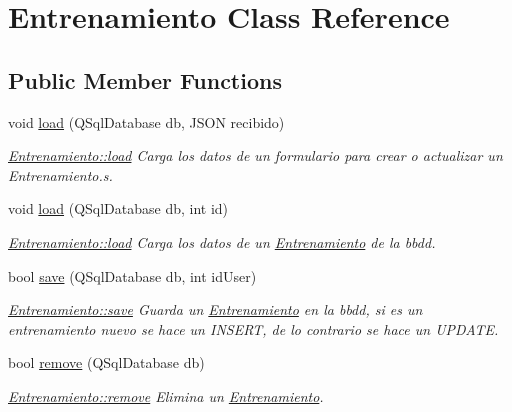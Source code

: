 \hypertarget{classEntrenamiento}{}\section{Entrenamiento Class Reference}
\label{classEntrenamiento}
\subsection*{Public Member Functions}
\begin{DoxyCompactItemize}
\item 
void \mbox{\hyperlink{classEntrenamiento_a5123ff9d743058d3c939b56926200f11}{load}} (Q\+Sql\+Database db, J\+S\+ON recibido)
\begin{DoxyCompactList}\small\item\em \mbox{\hyperlink{classEntrenamiento_a5123ff9d743058d3c939b56926200f11}{Entrenamiento\+::load}} Carga los datos de un formulario para crear o actualizar un Entrenamiento.\+s. \end{DoxyCompactList}\item 
void \mbox{\hyperlink{classEntrenamiento_a61ef0379c2793e1562b90597f6c37888}{load}} (Q\+Sql\+Database db, int id)
\begin{DoxyCompactList}\small\item\em \mbox{\hyperlink{classEntrenamiento_a5123ff9d743058d3c939b56926200f11}{Entrenamiento\+::load}} Carga los datos de un \mbox{\hyperlink{classEntrenamiento}{Entrenamiento}} de la bbdd. \end{DoxyCompactList}\item 
bool \mbox{\hyperlink{classEntrenamiento_a4b97075e3cb6f52c3e1bf2117e276875}{save}} (Q\+Sql\+Database db, int id\+User)
\begin{DoxyCompactList}\small\item\em \mbox{\hyperlink{classEntrenamiento_a4b97075e3cb6f52c3e1bf2117e276875}{Entrenamiento\+::save}} Guarda un \mbox{\hyperlink{classEntrenamiento}{Entrenamiento}} en la bbdd, si es un entrenamiento nuevo se hace un I\+N\+S\+E\+RT, de lo contrario se hace un U\+P\+D\+A\+TE. \end{DoxyCompactList}\item 
bool \mbox{\hyperlink{classEntrenamiento_adedf18d9eef76aab0c4d6325de2ff175}{remove}} (Q\+Sql\+Database db)
\begin{DoxyCompactList}\small\item\em \mbox{\hyperlink{classEntrenamiento_adedf18d9eef76aab0c4d6325de2ff175}{Entrenamiento\+::remove}} Elimina un \mbox{\hyperlink{classEntrenamiento}{Entrenamiento}}. \end{DoxyCompactList}\item 

\end{DoxyCompactItemize}
